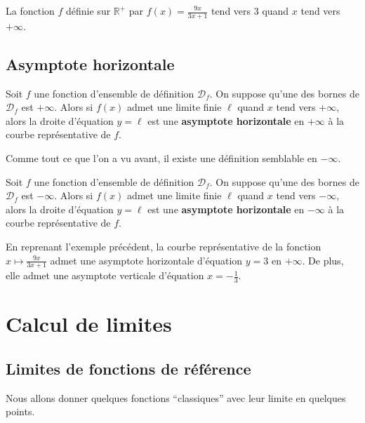 	\begin{tip}[Exemple]
		La fonction $f$ définie sur $\mathbb{R}^+$ par $f(x) = \frac{9x}{3x+1}$ tend vers $3$ quand $x$ tend vers $+\infty$.
	\end{tip}

	\subsection{Asymptote horizontale}

	\begin{formula}
		Soit $f$ une fonction d'ensemble de définition $\mathcal{D}_f$. On suppose qu'une des bornes de $\mathcal{D}_f$ est $+\infty$.
		\newpar
		Alors si $f(x)$ admet une limite finie $\ell$ quand $x$ tend vers $+\infty$, alors la droite d'équation $y = \ell$ est une \textbf{asymptote horizontale} en $+\infty$ à la courbe représentative de $f$.
	\end{formula}

	Comme tout ce que l'on a vu avant, il existe une définition semblable en $-\infty$.

	\begin{tip}
		Soit $f$ une fonction d'ensemble de définition $\mathcal{D}_f$. On suppose qu'une des bornes de $\mathcal{D}_f$ est $-\infty$.
		\newpar
		Alors si $f(x)$ admet une limite finie $\ell$ quand $x$ tend vers $-\infty$, alors la droite d'équation $y = \ell$ est une \textbf{asymptote horizontale} en $-\infty$ à la courbe représentative de $f$.
	\end{tip}

	\begin{tip}[Exemple]
		En reprenant l'exemple précédent, la courbe représentative de la fonction $x \mapsto \frac{9x}{3x+1}$ admet une asymptote horizontale d'équation $y=3$ en $+\infty$.
		\newpar
		De plus, elle admet une asymptote verticale d'équation $x=-\frac{1}{3}$.
	\end{tip}

	\section{Calcul de limites}

	\subsection{Limites de fonctions de référence}

	Nous allons donner quelques fonctions ``classiques'' avec leur limite en quelques points.

